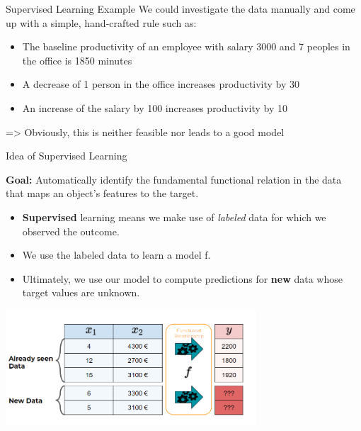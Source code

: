 \documentclass[11pt,compress,t,notes=noshow, xcolor=table]{beamer}
\begin{document}
\begin{vbframe}{Supervised Learning Example}
We could investigate the data manually and come up with a simple, hand-crafted rule such as:
	
	\begin{itemize}
		\item The baseline productivity of an employee with salary 3000 and 7 peoples in the office is 1850 minutes
		\item A decrease of 1 person in the office increases productivity by 30 
		\item An increase of the salary by 100 increases productivity by 10
	\end{itemize}

=> Obviously, this is neither feasible nor leads to a good model
\end{vbframe}


	
\begin{vbframe}{Idea of Supervised Learning}


\textbf{Goal:} Automatically identify the fundamental functional relation in the data 
  that maps an object's features to the target.

\begin{itemize}

  \item \textbf{Supervised} learning means we make use of \emph{labeled}
  data for which we observed the outcome.
  

  \item We use the labeled data to learn a model f.

  \item Ultimately, we use our model to compute predictions for 
  \textbf{new} data whose target values are unknown.
  
\end{itemize}

\begin{center}
  \includegraphics[width=0.7\textwidth]{figure_man/what_is_a_model_web} 
\end{center}
\end{vbframe}
\end{document}
